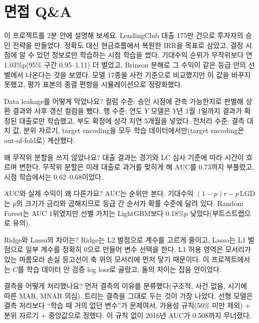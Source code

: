 \chapter{면접 Q\&A}

\begin{qa}{이 프로젝트를 2분 안에 설명해 보세요.}
LendingClub 대출 175만 건으로 투자자의 승인 전략을 만들었다. 정확도 대신 현금흐름에서 복원한 IRR을 목표로 삼았고, 결정 시점에 알 수 있던 정보로만 학습하는 시점 학습을 썼다. 기대수익 순위가 무작위보다 연 1.03\%p(95\% 구간 0.95--1.11) 더 벌었고, Brinson 분해로 그 수익이 같은 등급 안의 선별에서 나온다는 것을 보였다. 모델 17종을 사전 기준으로 비교했지만 이 값을 바꾸지 못했고, 평가 표본의 종결 편향을 시뮬레이션으로 정량화했다.
\end{qa}

\begin{qa}{Data leakage를 어떻게 막았나요?}
컬럼 수준: 승인 시점에 관측 가능한지로 판별해 상환 결과와 사후 갱신 컬럼을 뺐다. 행 수준: 연도 $Y$ 모델은 $Y$년 1월 1일까지 결과가 확정된 대출로만 학습했고, 부도 확정에 상각 지연 5개월을 넣었다. 전처리 수준: 결측 대치 값, 분위 자르기, target encoding을 모두 학습 데이터에서만(target encoding은 out-of-fold로) 계산했다.
\end{qa}

\begin{qa}{왜 무작위 분할을 쓰지 않았나요?}
대출 결과는 경기와 LC 심사 기준에 따라 시간이 흐르며 변한다. 무작위 분할은 미래 대출로 과거를 맞히게 해 AUC를 0.73까지 부풀렸고, 시점 학습에서는 0.62--0.68이었다.
\end{qa}

\begin{qa}{AUC와 실제 수익이 왜 다른가요?}
AUC는 순위만 본다. 기대수익 $(1-p)r-p\,\mathrm{LGD}$는 $p$의 크기가 금리와 곱해지므로 등급 간 순서가 확률 수준에 달려 있다. Random Forest는 AUC 1위였지만 선별 가치는 LightGBM보다 0.18\%p 낮았다(부트스트랩으로 유의).
\end{qa}

\begin{qa}{Ridge와 Lasso의 차이는?}
Ridge는 L2 벌점으로 계수를 고르게 줄이고, Lasso는 L1 벌점으로 일부 계수를 정확히 0으로 만들어 변수 선택을 한다. L1 허용 영역은 모서리가 있는 마름모라 손실 등고선이 축 위의 모서리에 먼저 닿기 때문이다. 이 프로젝트에서는 $C$를 학습 데이터 안 검증 log loss로 골랐고, 둘의 차이는 잡음 안이었다.
\end{qa}

\begin{qa}{결측을 어떻게 처리했나요?}
먼저 결측의 이유를 분류했다(구조적, 사건 없음, 시기에 따른 MAR, MNAR 의심). 트리는 결측을 그대로 두는 것이 가장 나았다. 선형 모델은 결측 처리보다 ``학습 때 거의 없던 변수''가 문제여서, 가용성 규칙(50\% 미만 제외) + 분위 자르기 + 중앙값으로 정했다. 이 규칙 없이 2016년 AUC가 0.508까지 무너졌다.
\end{qa}

